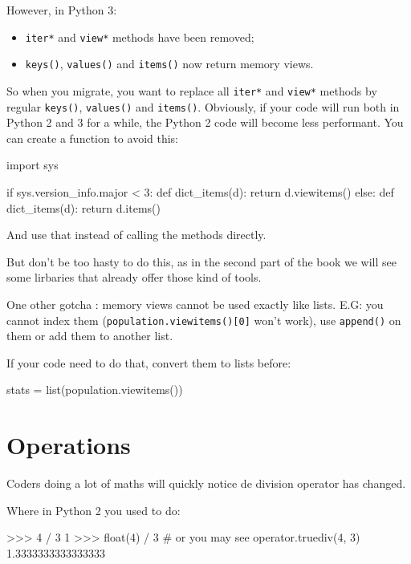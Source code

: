 However, in Python 3:

\begin{itemize}
    \item \lstinline{iter*} and \lstinline{view*} methods have been removed;
    \item \lstinline{keys()}, \lstinline{values()} and \lstinline{items()} now return memory views.
\end{itemize}

So when you migrate, you want to replace all \lstinline{iter*} and \lstinline{view*} methods by regular \lstinline{keys()}, \lstinline{values()} and \lstinline{items()}. Obviously, if your code will run both in Python 2 and 3 for a while, the Python 2 code will become less performant. You can create a function to avoid this:

\begin{py2and3}
import sys

if sys.version_info.major < 3:
    def dict_items(d):
        return d.viewitems()
else:
    def dict_items(d):
        return d.items()
\end{py2and3}

And use that instead of calling the methods directly.

But don't be too hasty to do this, as in the second part of the book we will see some lirbaries that already offer those kind of tools.

One other gotcha : memory views cannot be used exactly like lists. E.G: you cannot index them (\lstinline{population.viewitems()[0]} won't work), use \lstinline{append()} on them or add them to another list.

If your code need to do that, convert them to lists before:

\begin{py3}
stats = list(population.viewitems())
\end{py3}

\section{Operations}

Coders doing a lot of maths will quickly notice de division operator has changed.

Where in Python 2 you used to do:

\begin{py2}
>>> 4 / 3
1
>>> float(4) / 3  # or you may see operator.truediv(4, 3)
1.3333333333333333
\end{py2}

